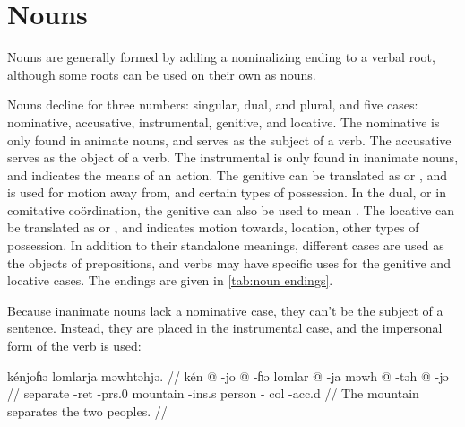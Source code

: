 \section{Nouns}

Nouns are generally formed by adding a nominalizing ending to a verbal root,
although some roots can be used on their own as nouns.

Nouns decline for three numbers: singular, dual, and plural, and five cases:
nominative, accusative, instrumental, genitive, and locative.
The nominative is only found in animate nouns, and serves as the subject of a
verb.
The accusative serves as the object of a verb.
The instrumental is only found in inanimate nouns, and indicates the means of
an action.
The genitive can be translated as  or , and is used for motion
away from, and certain types of possession.
In the dual, or in comitative coördination, the genitive can also be used to
mean .
The locative can be translated as  or , and indicates motion
towards, location, other types of possession.
In addition to their standalone meanings, different cases are used as the
objects of prepositions, and verbs may have specific uses for the genitive and
locative cases.
The endings are given in \cref{tab:noun endings}.

Because inanimate nouns lack a nominative case, they can't be the subject of a
sentence.
Instead, they are placed in the instrumental case, and the impersonal form of
the verb is used:

\ex
\begingl
    \glpreamble kénjoɦə lomlarja məwhtəhjə. //
    \gla kén @ -jo @ -ɦə lomlar @ -ja məwh @ -təh @ -jə //
    \glb separate -{\sc ret} -{\sc prs}.0 mountain -{\sc ins}.s person -{\sc
        col} -{\sc acc}.d //
    \glft The mountain separates the two peoples. //
\endgl
\xe

